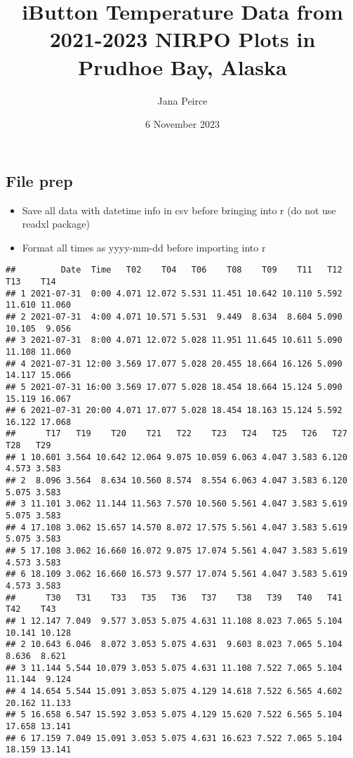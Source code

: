 \documentclass[
]{article}
\title{iButton Temperature Data from 2021-2023 NIRPO Plots in Prudhoe
Bay, Alaska}
\author{Jana Peirce}
\date{6 November 2023}
\providecommand{\tightlist}{%
  \setlength{\itemsep}{0pt}\setlength{\parskip}{0pt}}
\begin{document}
\maketitle

\subsection{File prep}\label{file-prep}

\begin{itemize}
\tightlist
\item
  Save all data with datetime info in csv before bringing into r (do not
  use readxl package)
\item
  Format all times as yyyy-mm-dd before importing into r
\end{itemize}

\begin{verbatim}
##         Date  Time   T02    T04   T06    T08    T09    T11   T12    T13    T14
## 1 2021-07-31  0:00 4.071 12.072 5.531 11.451 10.642 10.110 5.592 11.610 11.060
## 2 2021-07-31  4:00 4.071 10.571 5.531  9.449  8.634  8.604 5.090 10.105  9.056
## 3 2021-07-31  8:00 4.071 12.072 5.028 11.951 11.645 10.611 5.090 11.108 11.060
## 4 2021-07-31 12:00 3.569 17.077 5.028 20.455 18.664 16.126 5.090 14.117 15.066
## 5 2021-07-31 16:00 3.569 17.077 5.028 18.454 18.664 15.124 5.090 15.119 16.067
## 6 2021-07-31 20:00 4.071 17.077 5.028 18.454 18.163 15.124 5.592 16.122 17.068
##      T17   T19    T20    T21   T22    T23   T24   T25   T26   T27   T28   T29
## 1 10.601 3.564 10.642 12.064 9.075 10.059 6.063 4.047 3.583 6.120 4.573 3.583
## 2  8.096 3.564  8.634 10.560 8.574  8.554 6.063 4.047 3.583 6.120 5.075 3.583
## 3 11.101 3.062 11.144 11.563 7.570 10.560 5.561 4.047 3.583 5.619 5.075 3.583
## 4 17.108 3.062 15.657 14.570 8.072 17.575 5.561 4.047 3.583 5.619 5.075 3.583
## 5 17.108 3.062 16.660 16.072 9.075 17.074 5.561 4.047 3.583 5.619 4.573 3.583
## 6 18.109 3.062 16.660 16.573 9.577 17.074 5.561 4.047 3.583 5.619 4.573 3.583
##      T30   T31    T33   T35   T36   T37    T38   T39   T40   T41    T42    T43
## 1 12.147 7.049  9.577 3.053 5.075 4.631 11.108 8.023 7.065 5.104 10.141 10.128
## 2 10.643 6.046  8.072 3.053 5.075 4.631  9.603 8.023 7.065 5.104  8.636  8.621
## 3 11.144 5.544 10.079 3.053 5.075 4.631 11.108 7.522 7.065 5.104 11.144  9.124
## 4 14.654 5.544 15.091 3.053 5.075 4.129 14.618 7.522 6.565 4.602 20.162 11.133
## 5 16.658 6.547 15.592 3.053 5.075 4.129 15.620 7.522 6.565 5.104 17.658 13.141
## 6 17.159 7.049 15.091 3.053 5.075 4.631 16.623 7.522 7.065 5.104 18.159 13.141

\end{verbatim}
\end{document}
